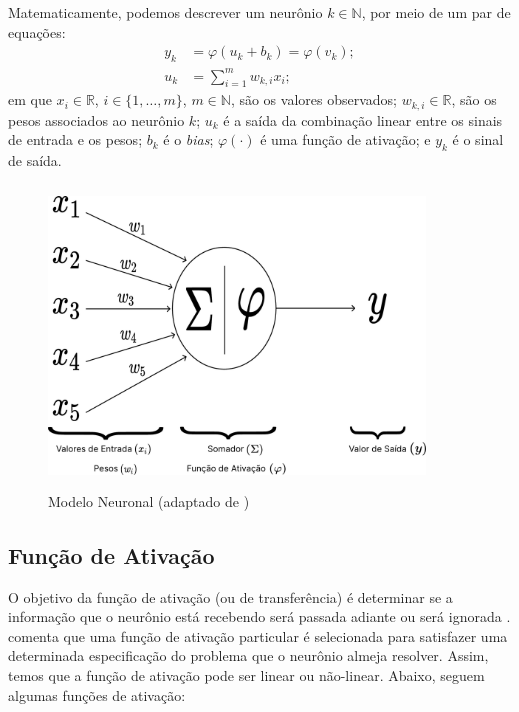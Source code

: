 \documentclass{automatextcc}
\newcommand{\R}{\mathds{R}}
\newcommand{\N}{\mathds{N}}
\begin{document}
Matematicamente, podemos descrever um neurônio $k \in \N$, por meio de um par de equações:
\begin{align*}
    y_k &= \varphi(u_k + b_k) = \varphi(v_k);\\[.2cm]
    u_k &= \displaystyle{\sum_{i=1}^{m} }w_{k,i}x_i;
\end{align*}
em que $x_i \in \R$, $i \in \{1,\dots,m\}$, $m \in \N$, são os valores observados; $w_{k,i} \in \R$, são os pesos associados ao neurônio $k$; $u_k$ é a saída da combinação linear entre os sinais de entrada e os pesos; $b_k$ é o \textit{bias}; $\varphi(\cdot)$ é uma função de ativação; e $y_k$ é o sinal de saída.

\begin{figure}
    \centering
    \includegraphics[width=10cm,height=8cm]{figuras/neuron_model.pdf}
	\caption{Modelo Neuronal (adaptado de \citet{haykin2001,hair2005})}
\end{figure}

\subsection{Função de Ativação}
O objetivo da função de ativação (ou de transferência) é determinar se a informação que o neurônio está recebendo será passada adiante ou será ignorada \citep{dsa2022}. \citet{hagan2014} comenta que uma função de ativação particular é selecionada para satisfazer uma determinada especificação do problema que o neurônio almeja resolver. Assim, temos que a função de ativação pode ser linear ou não-linear. Abaixo, seguem algumas funções de ativação:
\end{document}
